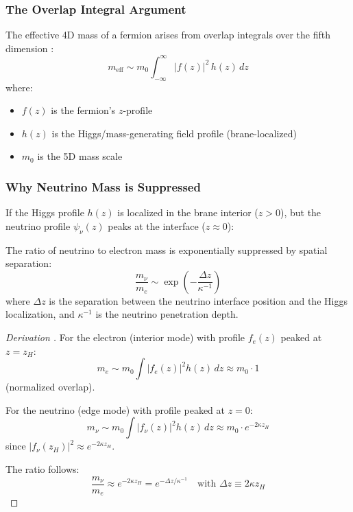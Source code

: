 \subsubsection{The Overlap Integral Argument}

The effective 4D mass of a fermion arises from overlap integrals over the
fifth dimension \tagBL{}:
\begin{equation}
    m_{\text{eff}} \sim m_0 \int_{-\infty}^{\infty} |f(z)|^2 \, h(z) \, dz
    \label{eq:ch6_overlap}
\end{equation}
where:
\begin{itemize}[nosep]
    \item $f(z)$ is the fermion's $z$-profile
    \item $h(z)$ is the Higgs/mass-generating field profile (brane-localized)
    \item $m_0$ is the 5D mass scale
\end{itemize}

\subsubsection{Why Neutrino Mass is Suppressed}

If the Higgs profile $h(z)$ is localized in the brane interior ($z > 0$),
but the neutrino profile $\psi_\nu(z)$ peaks at the interface ($z \approx 0$):

\begin{proposition}
\label{prop:ch6_suppression}
The ratio of neutrino to electron mass is exponentially suppressed by
spatial separation:
\begin{equation}
    \frac{m_\nu}{m_e} \sim \exp\left(-\frac{\Delta z}{\kappa^{-1}}\right)
    \label{eq:ch6_mass_ratio}
\end{equation}
where $\Delta z$ is the separation between the neutrino interface position
and the Higgs localization, and $\kappa^{-1}$ is the neutrino penetration depth.
\end{proposition}

\begin{proof}[Derivation \tagDc{}]
For the electron (interior mode) with profile $f_e(z)$ peaked at $z = z_H$:
\begin{equation}
    m_e \sim m_0 \int |f_e(z)|^2 h(z) \, dz \approx m_0 \cdot 1
\end{equation}
(normalized overlap).

For the neutrino (edge mode) with profile peaked at $z = 0$:
\begin{equation}
    m_\nu \sim m_0 \int |f_\nu(z)|^2 h(z) \, dz
    \approx m_0 \cdot e^{-2\kappa z_H}
\end{equation}
since $|f_\nu(z_H)|^2 \approx e^{-2\kappa z_H}$.

The ratio follows:
\begin{equation}
    \frac{m_\nu}{m_e} \approx e^{-2\kappa z_H} = e^{-\Delta z/\kappa^{-1}}
    \quad \text{with } \Delta z \equiv 2\kappa z_H
\end{equation}
\end{proof}

